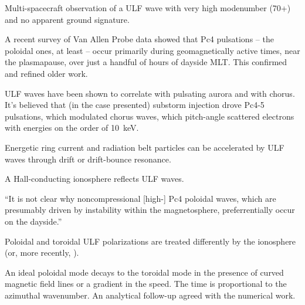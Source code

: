 
Multi-spacecraft observation of a ULF wave with very high modenumber (70+) and no apparent ground signature\cite{takahashi_2013}. 

A recent survey of Van Allen Probe data showed that Pc4 pulsations -- the poloidal ones, at least -- occur primarily during geomagnetically active times, near the plasmapause, over just a handful of hours of dayside MLT\cite{dai_2015}. This confirmed and refined older work\cite{engebretson_1987}. 

ULF waves have been shown to correlate with pulsating aurora and with chorus\cite{jaynes_2015}. It's believed that (in the case presented) substorm injection drove Pc4-5 pulsations, which modulated chorus waves, which pitch-angle scattered electrons with energies on the order of \SI{10}{\kilo\eV}. 

Energetic ring current and radiation belt particles can be accelerated by ULF waves through drift or drift-bounce resonance\cite{southwood_1976}. 

A Hall-conducting ionosphere reflects ULF waves\cite{hughes_1974}. 

``It is not clear why noncompressional [high-\azm] Pc4 poloidal waves, which are presumably driven by instability within the magnetosphere, preferrentially occur on the dayside.\cite{dai_2015}''

Poloidal and toroidal ULF polarizations are treated differently by the ionosphere\cite{greifinger_1968} (or, more recently, \cite{fujita_1988}).  



An ideal poloidal mode decays to the toroidal mode in the presence of curved magnetic field lines\cite{radoski_1974} or a gradient in the \Alfven speed\cite{mann_1995}. The time is proportional to the azimuthal wavenumber\cite{mann_1995}. An analytical follow-up agreed with the numerical work\cite{mann_1997}. 


